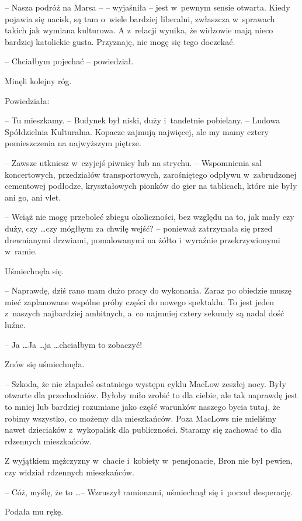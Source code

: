 \documentclass[oneside,polish,11pt,rmheadings]{mwbk}
\begin{document}
-- Nasza podróż na Marsa --  -- wyjaśniła -- jest w~pewnym sensie otwarta. Kiedy pojawia się nacisk, są tam o~wiele bardziej liberalni, zwłaszcza w~sprawach takich jak wymiana kulturowa. A z~relacji wynika, że widzowie mają nieco bardziej katolickie gusta. Przyznaję, nie mogę się tego doczekać.

-- Chciałbym pojechać -- powiedział. 

Minęli kolejny róg. 

Powiedziała: 

-- Tu mieszkamy. -- Budynek był niski, duży i~tandetnie pobielany. -- Ludowa Spółdzielnia Kulturalna. Kopacze zajmują najwięcej, ale my mamy cztery pomieszczenia na najwyższym piętrze. 

-- Zawsze utkniesz w~czyjejś piwnicy lub na strychu. -- Wspomnienia sal koncertowych, przedziałów transportowych, zarośniętego odpływu w~zabrudzonej cementowej podłodze, kryształowych pionków do gier na tablicach, które nie były ani go, ani vlet. 

-- Wciąż nie mogę przeboleć zbiegu okoliczności, bez względu na to, jak mały czy duży, czy \ldots  czy mógłbym za chwilę wejść? -- ponieważ zatrzymała się przed drewnianymi drzwiami, pomalowanymi na żółto i~wyraźnie przekrzywionymi w~ramie. 

Uśmiechnęła się. 

-- Naprawdę, dziś rano mam dużo pracy do wykonania. Zaraz po obiedzie muszę mieć zaplanowane wspólne próby części do nowego spektaklu. To jest jeden z~naszych najbardziej ambitnych, a~co najmniej cztery sekundy są nadal dość luźne. 

-- Ja \ldots  Ja \ldots  ja \ldots  chciałbym to zobaczyć! 

Znów się uśmiechnęła. 

-- Szkoda, że nie złapałeś ostatniego występu cyklu MacLow zeszłej nocy. Były otwarte dla przechodniów. Byłoby miło zrobić to dla ciebie, ale tak naprawdę jest to mniej lub bardziej rozumiane jako część warunków naszego bycia tutaj, że robimy wszystko, co możemy dla mieszkańców. Poza MacLows nie mieliśmy nawet dzieciaków z~wykopalisk dla publiczności. Staramy się zachować to dla rdzennych mieszkańców. 

Z wyjątkiem mężczyzny w~chacie i~kobiety w~pensjonacie, Bron nie był pewien, czy widział rdzennych mieszkańców. 

-- Cóż, myślę, że to \ldots  -- Wzruszył ramionami, uśmiechnął się i~poczuł desperację. 

Podała mu rękę.
\end{document}
